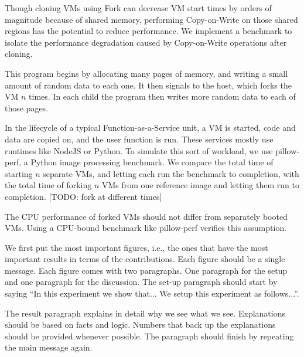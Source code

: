  Though cloning VMs using Fork can decrease VM start times by orders of magnitude because of shared memory, performing Copy-on-Write on those shared regions has the potential to reduce performance. We implement a benchmark to isolate the performance degradation caused by Copy-on-Write operations after cloning.

This program begins by allocating many pages of memory, and writing a small amount of random data to each one. It then signals to the host, which forks the VM $n$ times. In each child the program then writes more random data to each of those pages.

 In the lifecycle of a typical Function-as-a-Service unit, a VM is started, code and data are copied on, and the user function is run. These services mostly use runtimes like NodeJS or Python. To simulate this sort of workload, we use pillow-perf, a Python image processing benchmark. We compare the total time of starting $n$ separate VMs, and letting each run the benchmark to completion, with the total time of forking $n$ VMs from one reference image and letting them run to completion. [TODO: fork at different times]

The CPU performance of forked VMs should not differ from separately booted VMs. Using a CPU-bound benchmark like pillow-perf verifies this assumption.

We first put the most important figures, i.e., the
ones that have the most important results in terms
of the contributions. Each figure should be a
single message. Each figure comes with two
paragraphs. One paragraph for the setup and one
paragraph for the discussion. The set-up paragraph
should start by saying ``In this experiment we
show that... We setup this experiment as follows...''.

The result paragraph explains in detail why we see
what we see. Explanations should be based on facts
and logic. Numbers that back up the explanations
should be provided whenever possible. The
paragraph should finish by repeating the main
message again.
